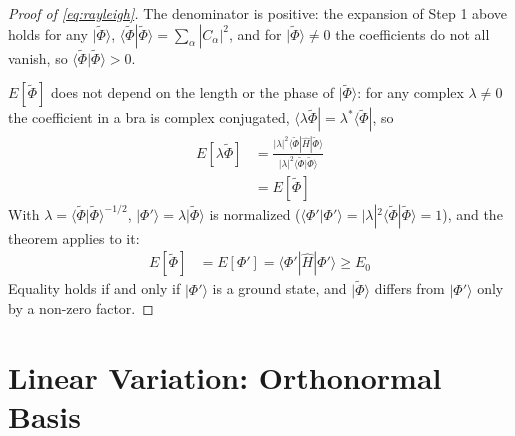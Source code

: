 \begin{proof}[Proof of \eqref{eq:rayleigh}]
The denominator is positive: the expansion of Step 1 above holds for any $|\tilde{\Phi}\rangle$, $\langle\tilde{\Phi}|\tilde{\Phi}\rangle = \sum_\alpha |C_\alpha|^2$, and for $|\tilde{\Phi}\rangle \neq 0$ the coefficients do not all vanish, so $\langle\tilde{\Phi}|\tilde{\Phi}\rangle > 0$.

$E[\tilde{\Phi}]$ does not depend on the length or the phase of $|\tilde{\Phi}\rangle$: for any complex $\lambda \neq 0$ the coefficient in a bra is complex conjugated, $\langle\lambda\tilde{\Phi}| = \lambda^* \langle\tilde{\Phi}|$, so
\begin{align*}
E[\lambda\tilde{\Phi}] &= \frac{|\lambda|^2 \langle\tilde{\Phi}|\hat{H}|\tilde{\Phi}\rangle}{|\lambda|^2 \langle\tilde{\Phi}|\tilde{\Phi}\rangle} \\
&= E[\tilde{\Phi}]
\end{align*}
With $\lambda = \langle\tilde{\Phi}|\tilde{\Phi}\rangle^{-1/2}$, $|\Phi'\rangle = \lambda |\tilde{\Phi}\rangle$ is normalized ($\langle\Phi'|\Phi'\rangle = |\lambda|^2 \langle\tilde{\Phi}|\tilde{\Phi}\rangle = 1$), and the theorem applies to it:
\begin{align*}
E[\tilde{\Phi}] &= E[\Phi'] = \langle\Phi'|\hat{H}|\Phi'\rangle \ge E_0
\end{align*}
Equality holds if and only if $|\Phi'\rangle$ is a ground state, and $|\tilde{\Phi}\rangle$ differs from $|\Phi'\rangle$ only by a non-zero factor.
\end{proof}

\section{Linear Variation: Orthonormal Basis}


